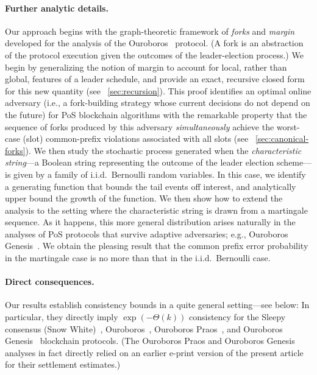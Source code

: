 \paragraph{Further analytic details.} Our approach begins with the
graph-theoretic framework of \emph{forks} and \emph{margin} developed
for the analysis of the Ouroboros~\cite{KRDO17} protocol.  (A fork is
an abstraction of the protocol execution given the outcomes of the
leader-election process.)  We begin by generalizing the notion of
margin to account for local, rather than global, features of a leader
schedule, and provide an exact, recursive closed form for this new
quantity (see \Section~\ref{sec:recursion}). This proof identifies an
optimal online adversary (i.e., a fork-building strategy whose current
decisions do not depend on the future) for PoS blockchain algorithms
with the remarkable property that the sequence of forks produced by
this adversary \emph{simultaneously} achieve the worst-case (slot)
common-prefix violations associated with all slots (see
\Section~\ref{sec:canonical-forks}). We then study the stochastic
process generated when the \emph{characteristic string}---a Boolean
string representing the outcome of the leader election scheme---is
given by a family of i.i.d.\ Bernoulli random variables. In this case,
we identify a generating function that bounds the tail events off
interest, and analytically upper bound the growth of the function. We
then show how to extend the analysis to the setting where the
characteristic string is drawn from a martingale sequence.  As it
happens, this more general distribution arises naturally in the
analyses of PoS protocols that survive adaptive adversaries; e.g.,
Ouroboros Genesis~\cite{DBLP:journals/iacr/BadertscherGKRZ18}.  We
obtain the pleasing result that the common prefix error probability in
the martingale case is no more than that in the i.i.d.\ Bernoulli
case.

\paragraph{Direct consequences.} 
Our results establish consistency bounds in a quite general
setting---see below: In particular, they directly imply
$\exp(-\Theta(k))$ consistency for the Sleepy consensus (Snow
White)~\cite{DBLP:conf/asiacrypt/PassS17}, Ouroboros~\cite{KRDO17},
Ouroboros Praos~\cite{DBLP:conf/eurocrypt/DavidGKR18}, and Ouroboros
Genesis~\cite{DBLP:journals/iacr/BadertscherGKRZ18} blockchain
protocols. (The Ouroboros Praos and Ouroboros Genesis analyses in fact
directly relied on an earlier e-print version of the present article
for their settlement estimates.)


